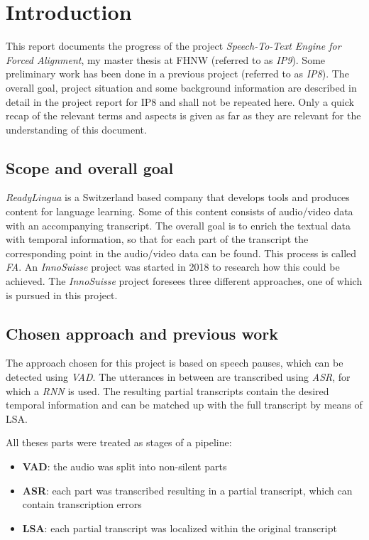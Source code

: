 \section{Introduction}\label{intro}
This report documents the progress of the project \textit{Speech-To-Text Engine for Forced Alignment}, my master thesis at \ac{FHNW} (referred to as \textit{IP9}). Some preliminary work has been done in a previous project (referred to as \textit{IP8}). The overall goal, project situation and some background information are described in detail in the project report for IP8 and shall not be repeated here. Only a quick recap of the relevant terms and aspects is given as far as they are relevant for the understanding of this document.

\subsection{Scope and overall goal}
\textit{ReadyLingua} is a Switzerland based company that develops tools and produces content for language learning. Some of this content consists of audio/video data with an accompanying transcript. The overall goal is to enrich the textual data with temporal information, so that for each part of the transcript the corresponding point in the audio/video data can be found. This process is called \textit{\ac{FA}}. An \textit{InnoSuisse} project was started in 2018 to research how this could be achieved. The \textit{InnoSuisse} project foresees three different approaches, one of which is pursued in this project.

\subsection{Chosen approach and previous work}
The approach chosen for this project is based on speech pauses, which can be detected using \textit{\ac{VAD}}. The utterances in between are transcribed using \textit{\ac{ASR}}, for which a \textit{\ac{RNN}} is used. The resulting partial transcripts contain the desired temporal information and can be matched up with the full transcript by means of \ac{LSA}.

All theses parts were treated as stages of a pipeline:

\begin{itemize}
	\item \textbf{\ac{VAD}}: the audio was split into non-silent parts
	\item \textbf{\ac{ASR}}: each part was transcribed resulting in a partial transcript, which can contain transcription errors
	\item \textbf{\ac{LSA}}: each partial transcript was localized within the original transcript	
\end{itemize}

